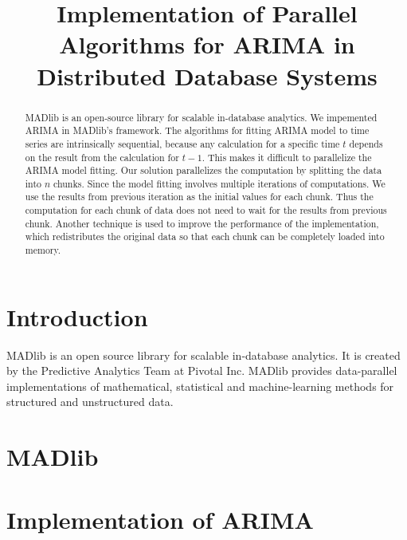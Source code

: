 \documentclass[english, 12pt]{article} \usepackage[T1]{fontenc}
\begin{document}
\title{Implementation of Parallel Algorithms for ARIMA in Distributed
  Database Systems}


\maketitle

\begin{abstract} 
    MADlib is an open-source library for scalable in-database analytics. We
    impemented ARIMA in MADlib's framework. The algorithms for fitting ARIMA
    model to time series are intrinsically sequential, because any calculation
    for a specific time $t$ depends on the result from the calculation for
    $t-1$.  This makes it difficult to parallelize the ARIMA model fitting. Our
    solution parallelizes the computation by splitting the data into $n$
    chunks. Since the model fitting involves multiple iterations of
    computations. We use the results from previous iteration as the initial
    values for each chunk. Thus the computation for each chunk of data does not
    need to wait for the results from previous chunk. Another technique is used
    to improve the performance of the implementation, which redistributes the
    original data so that each chunk can be completely loaded into memory.
\end{abstract}

\section{Introduction}

MADlib \cite{madlib} is an open source library for scalable in-database
analytics.  It is created by the Predictive Analytics Team at Pivotal Inc.
MADlib provides data-parallel implementations of mathematical, statistical and
machine-learning methods for structured and unstructured data. 

\section{MADlib}


\section{Implementation of ARIMA}

\end{document}
